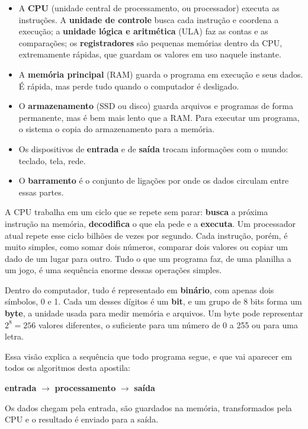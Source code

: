 \begin{itemize}
  \item A \textbf{CPU} (unidade central de processamento, ou processador) executa as instruções. A \textbf{unidade de controle} busca cada instrução e coordena a execução; a \textbf{unidade lógica e aritmética} (ULA) faz as contas e as comparações; os \textbf{registradores} são pequenas memórias dentro da CPU, extremamente rápidas, que guardam os valores em uso naquele instante.
  \item A \textbf{memória principal} (RAM) guarda o programa em execução e seus dados. É rápida, mas perde tudo quando o computador é desligado.
  \item O \textbf{armazenamento} (SSD ou disco) guarda arquivos e programas de forma permanente, mas é bem mais lento que a RAM. Para executar um programa, o sistema o copia do armazenamento para a memória.
  \item Os dispositivos de \textbf{entrada} e de \textbf{saída} trocam informações com o mundo: teclado, tela, rede.
  \item O \textbf{barramento} é o conjunto de ligações por onde os dados circulam entre essas partes.
\end{itemize}

A CPU trabalha em um ciclo que se repete sem parar: \textbf{busca} a próxima instrução na memória, \textbf{decodifica} o que ela pede e a \textbf{executa}. Um processador atual repete esse ciclo bilhões de vezes por segundo. Cada instrução, porém, é muito simples, como somar dois números, comparar dois valores ou copiar um dado de um lugar para outro. Tudo o que um programa faz, de uma planilha a um jogo, é uma sequência enorme dessas operações simples.

Dentro do computador, tudo é representado em \textbf{binário}, com apenas dois símbolos, 0 e 1. Cada um desses dígitos é um \textbf{bit}, e um grupo de 8 bits forma um \textbf{byte}, a unidade usada para medir memória e arquivos. Um byte pode representar $2^8 = 256$ valores diferentes, o suficiente para um número de 0 a 255 ou para uma letra.

Essa visão explica a sequência que todo programa segue, e que vai aparecer em todos os algoritmos desta apostila:

\begin{center}
\textbf{entrada} $\rightarrow$ \textbf{processamento} $\rightarrow$ \textbf{saída}
\end{center}

Os dados chegam pela entrada, são guardados na memória, transformados pela CPU e o resultado é enviado para a saída.

